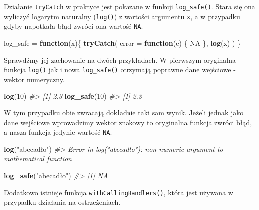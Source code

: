 \documentclass[paper=6in:9in,pagesize=pdftex,headinclude=on,footinclude=on,10pt]{scrbook}
\makeatletter
\newenvironment{Shaded}{\begin{snugshade}}{\end{snugshade}}
\newcommand{\CommentTok}[1]{\textcolor[rgb]{0.56,0.35,0.01}{\textit{#1}}}
\newcommand{\ControlFlowTok}[1]{\textcolor[rgb]{0.13,0.29,0.53}{\textbf{#1}}}
\newcommand{\DataTypeTok}[1]{\textcolor[rgb]{0.13,0.29,0.53}{#1}}
\newcommand{\DecValTok}[1]{\textcolor[rgb]{0.00,0.00,0.81}{#1}}
\newcommand{\KeywordTok}[1]{\textcolor[rgb]{0.13,0.29,0.53}{\textbf{#1}}}
\newcommand{\NormalTok}[1]{#1}
\newcommand{\OtherTok}[1]{\textcolor[rgb]{0.56,0.35,0.01}{#1}}
\newcommand{\StringTok}[1]{\textcolor[rgb]{0.31,0.60,0.02}{#1}}
\newenvironment{kframe}{%
\medskip{}
\setlength{\fboxsep}{.8em}
 \def\at@end@of@kframe{}%
 \ifinner\ifhmode%
  \def\at@end@of@kframe{\end{minipage}}%
  \begin{minipage}{\columnwidth}%
 \fi\fi%
 \def\FrameCommand##1{\hskip\@totalleftmargin \hskip-\fboxsep
 \colorbox{shadecolor}{##1}\hskip-\fboxsep
     \hskip-\linewidth \hskip-\@totalleftmargin \hskip\columnwidth}%
 \MakeFramed {\advance\hsize-\width
   \@totalleftmargin\z@ \linewidth\hsize
   \@setminipage}}%
 {\par\unskip\endMakeFramed%
 \at@end@of@kframe}
\newenvironment{rmdblock}[1]
  {
  \begin{itemize}
  \renewcommand{\labelitemi}{
    \raisebox{-.7\height}[0pt][0pt]{
      {\setkeys{Gin}{width=3em,keepaspectratio}\texttt{[image: images/\#1]}}
    }
  }
  \setlength{\fboxsep}{1em}
  \begin{kframe}
  \item
  }
  {
  \end{kframe}
  \end{itemize}
  }
\newenvironment{rmdinfo}
  {\begin{rmdblock}{compass}}
  {\end{rmdblock}}
\makeatother
\begin{document}
Działanie \texttt{tryCatch} w praktyce jest pokazane w funkcji \texttt{log\_safe()}.
Stara się ona wyliczyć logarytm naturalny (\texttt{log()}) z wartości argumentu \texttt{x}, a w przypadku gdyby napotkała błąd zwróci ona wartość \texttt{NA}.

\begin{Shaded}
\begin{Highlighting}[]
\NormalTok{log_safe =}\StringTok{ }\ControlFlowTok{function}\NormalTok{(x)\{}
  \KeywordTok{tryCatch}\NormalTok{(}
  \DataTypeTok{error =} \ControlFlowTok{function}\NormalTok{(e) \{}
    \OtherTok{NA}
\NormalTok{  \},}
  \KeywordTok{log}\NormalTok{(x)}
\NormalTok{  )}
\NormalTok{\}}
\end{Highlighting}
\end{Shaded}

Sprawdźmy jej zachowanie na dwóch przykładach.
W pierwszym oryginalna funkcja \texttt{log()} jak i nowa \texttt{log\_safe()} otrzymają poprawne dane wejściowe - wektor numeryczny.

\begin{Shaded}
\begin{Highlighting}[]
\KeywordTok{log}\NormalTok{(}\DecValTok{10}\NormalTok{)}
\CommentTok{#> [1] 2.3}
\KeywordTok{log_safe}\NormalTok{(}\DecValTok{10}\NormalTok{)}
\CommentTok{#> [1] 2.3}
\end{Highlighting}
\end{Shaded}

W tym przypadku obie zwracają dokładnie taki sam wynik.
Jeżeli jednak jako dane wejściowe wprowadzimy wektor znakowy to oryginalna funkcja zwróci błąd, a nasza funkcja jedynie wartość \texttt{NA}.

\begin{Shaded}
\begin{Highlighting}[]
\KeywordTok{log}\NormalTok{(}\StringTok{"abecadło"}\NormalTok{)}
\CommentTok{#> Error in log("abecadło"): non-numeric argument to mathematical function}
\end{Highlighting}
\end{Shaded}

\begin{Shaded}
\begin{Highlighting}[]
\KeywordTok{log_safe}\NormalTok{(}\StringTok{"abecadło"}\NormalTok{)}
\CommentTok{#> [1] NA}
\end{Highlighting}
\end{Shaded}

\begin{rmdinfo}
\begin{rmdinfo}

Dodatkowo istnieje funkcja \texttt{withCallingHandlers()}, która jest używana w przypadku działania na ostrzeżeniach.

\end{rmdinfo}
\end{rmdinfo}
\end{document}
